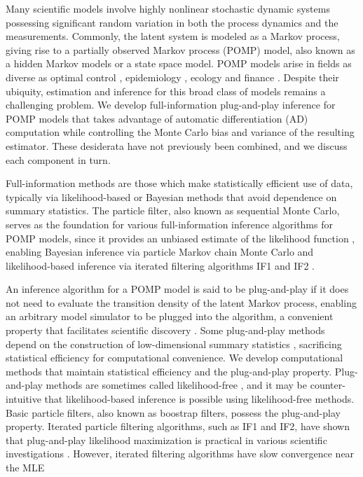 \documentclass[11pt]{article}
\begin{document}
Many scientific models involve highly nonlinear stochastic dynamic systems possessing significant random variation in both the process dynamics and the measurements.
Commonly, the latent system is modeled as a Markov process, giving rise to a partially observed Markov process (POMP) model, also known as a hidden Markov models or a state space model.
POMP models arise in fields as diverse as optimal control \citep{singh22}, epidemiology \citep{he10, stocks17}, ecology \citep{knape12} and finance \citep{kim08, breto14}.
Despite their ubiquity, estimation and inference for this broad class of models remains a challenging problem.
We develop full-information plug-and-play inference for POMP models that takes advantage of automatic differentiation (AD) computation while controlling the Monte Carlo bias and variance of the resulting estimator.
These desiderata have not previously been combined, and we discuss each component in turn.

Full-information methods are those which make statistically efficient use of data, typically via likelihood-based or Bayesian methods that avoid dependence on summary statistics.
The particle filter, also known as sequential Monte Carlo, serves as the foundation for various full-information inference algorithms for POMP models, since it provides an unbiased estimate of the likelihood function \citep{delMoral04}, enabling Bayesian inference via particle Markov chain Monte Carlo \citep{andrieu10} and likelihood-based inference via iterated filtering algorithms IF1 \citep{ionides06-pnas} and IF2 \citep{ionides15}.

An inference algorithm for a POMP model is said to be plug-and-play if it does not need to evaluate the transition density of the latent Markov process, enabling an arbitrary model simulator to be plugged into the algorithm, a convenient property that facilitates scientific discovery \citep{he10}.
Some plug-and-play methods depend on the construction of low-dimensional summary statistics \citep{wood10,toni09}, sacrificing statistical efficiency for computational convenience.
We develop computational methods that maintain statistical efficiency and the plug-and-play property.
Plug-and-play methods are sometimes called likelihood-free \citep{owen15}, and it may be counter-intuitive that likelihood-based inference is possible using likelihood-free methods. 
Basic particle filters, also known as boostrap filters, possess the plug-and-play property.
Iterated particle filtering algorithms, such as IF1 and IF2, have shown that plug-and-play likelihood maximization is practical in various scientific investigations \citep{king08,blake14,pons-salort18,subramanian21,fox22,drake23}.
However, iterated filtering algorithms have slow convergence near the MLE \citep{doucet13}
\end{document}
